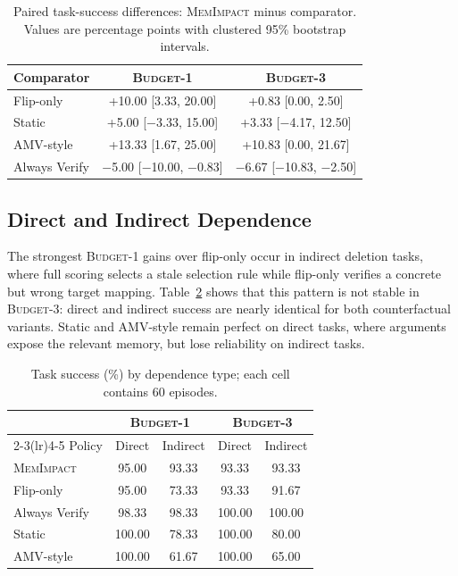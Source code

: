 \documentclass[11pt]{article}
\newcommand{\method}{\textsc{MemImpact}\xspace}
\newcommand{\BOne}{\textsc{Budget-1}\xspace}
\newcommand{\BThree}{\textsc{Budget-3}\xspace}
\begin{document}
\begin{table}[t]
\centering
\small
\caption{Paired task-success differences: \method minus comparator. Values are percentage points with clustered 95\% bootstrap intervals.}
\label{tab:paired}
\begin{tabular}{lcc}
\toprule
Comparator & \BOne & \BThree \\
\midrule
Flip-only & +10.00 [3.33, 20.00] & +0.83 [0.00, 2.50] \\
Static & +5.00 [$-$3.33, 15.00] & +3.33 [$-$4.17, 12.50] \\
AMV-style & +13.33 [1.67, 25.00] & +10.83 [0.00, 21.67] \\
Always Verify & $-$5.00 [$-$10.00, $-$0.83] & $-$6.67 [$-$10.83, $-$2.50] \\
\bottomrule
\end{tabular}
\end{table}

\subsection{Direct and Indirect Dependence}

The strongest \BOne gains over flip-only occur in indirect deletion tasks, where full scoring selects a stale selection rule while flip-only verifies a concrete but wrong target mapping. Table~\ref{tab:dependence} shows that this pattern is not stable in \BThree: direct and indirect success are nearly identical for both counterfactual variants. Static and AMV-style remain perfect on direct tasks, where arguments expose the relevant memory, but lose reliability on indirect tasks.

\begin{table}[t]
\centering
\small
\caption{Task success (\%) by dependence type; each cell contains 60 episodes.}
\label{tab:dependence}
\begin{tabular}{lcccc}
\toprule
& \multicolumn{2}{c}{\BOne} & \multicolumn{2}{c}{\BThree} \\
\cmidrule(lr){2-3}\cmidrule(lr){4-5}
Policy & Direct & Indirect & Direct & Indirect \\
\midrule
\method & 95.00 & 93.33 & 93.33 & 93.33 \\
Flip-only & 95.00 & 73.33 & 93.33 & 91.67 \\
Always Verify & 98.33 & 98.33 & 100.00 & 100.00 \\
Static & 100.00 & 78.33 & 100.00 & 80.00 \\
AMV-style & 100.00 & 61.67 & 100.00 & 65.00 \\
\bottomrule
\end{tabular}
\end{table}
\end{document}
